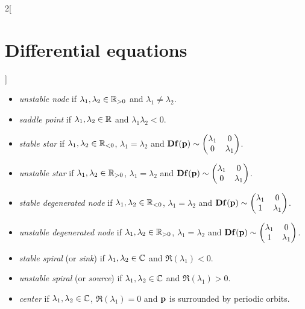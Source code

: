 \documentclass[../../../main.tex]{subfiles}
\begin{document}
\begin{multicols}{2}[\section{Differential equations}]
\begin{definition}
\begin{itemize}
      \item \emph{unstable node} if $\lambda_1,\lambda_2\in\mathbb{R}_{>0}$ and $\lambda_1\ne\lambda_2$.
      \item \emph{saddle point} if $\lambda_1,\lambda_2\in\mathbb{R}$ and $\lambda_1\lambda_2<0$.
      \item \emph{stable star} if $\lambda_1,\lambda_2\in\mathbb{R}_{<0}$, $\lambda_1=\lambda_2$ and $\boldsymbol{\mathrm{Df}}(\boldsymbol{\mathrm{p}})\sim
              \begin{pmatrix}
                \lambda_1 & 0         \\
                0         & \lambda_1
              \end{pmatrix}$.
      \item \emph{unstable star} if $\lambda_1,\lambda_2\in\mathbb{R}_{>0}$, $\lambda_1=\lambda_2$ and $\boldsymbol{\mathrm{Df}}(\boldsymbol{\mathrm{p}})\sim
              \begin{pmatrix}
                \lambda_1 & 0         \\
                0         & \lambda_1
              \end{pmatrix}$.
      \item \emph{stable degenerated node} if $\lambda_1,\lambda_2\in\mathbb{R}_{<0}$, $\lambda_1=\lambda_2$ and $\boldsymbol{\mathrm{Df}}(\boldsymbol{\mathrm{p}})\sim
              \begin{pmatrix}
                \lambda_1 & 0         \\
                1         & \lambda_1
              \end{pmatrix}$.
      \item \emph{unstable degenerated node} if $\lambda_1,\lambda_2\in\mathbb{R}_{>0}$, $\lambda_1=\lambda_2$ and $\boldsymbol{\mathrm{Df}}(\boldsymbol{\mathrm{p}})\sim
              \begin{pmatrix}
                \lambda_1 & 0         \\
                1         & \lambda_1
              \end{pmatrix}$.
      \item \emph{stable spiral} (or \emph{sink}) if $\lambda_1,\lambda_2\in\mathbb{C}$ and $\Re(\lambda_1)<0$.
      \item \emph{unstable spiral} (or \emph{source}) if $\lambda_1,\lambda_2\in\mathbb{C}$ and $\Re(\lambda_1)>0$.
      \item \emph{center} if $\lambda_1,\lambda_2\in\mathbb{C}$, $\Re(\lambda_1)=0$ and $\boldsymbol{\mathrm{p}}$ is surrounded by periodic orbits.
    \end{itemize}
  \end{definition}
  \begin{center}
    \begin{minipage}{\linewidth}
      \centering
      
    \end{minipage}
  \end{center}

\end{multicols}
\end{document}
